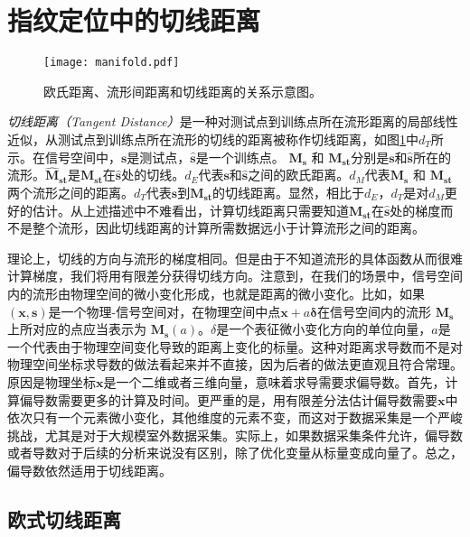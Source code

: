\section{指纹定位中的切线距离}

\begin{figure}[tb]
	\centering
	\texttt{[image: manifold.pdf]}
	\caption{欧氏距离、流形间距离和切线距离的关系示意图。}
	\label{fig:manifold}
\end{figure}

\textit{切线距离（Tangent Distance）}是一种对测试点到训练点所在流形距离的局部线性近似，从测试点到训练点所在流形的切线的距离被称作切线距离，如图\ref{fig:manifold}中$d_T$所示。在信号空间中，$\mathbf{s}$是测试点，$\widehat{\mathbf{s}}$是一个训练点。 $\boldsymbol{M_s}$ 和 $\boldsymbol{M_{st}}$分别是$\mathbf{s}$和$\widehat{\mathbf{s}}$所在的流形。$\boldsymbol{\widehat{M}_{st}}$是$\boldsymbol{M_{st}}$在$\widehat{\mathbf{s}}$处的切线。$d_E$代表$\mathbf{s}$和$\widehat{\mathbf{s}}$之间的欧氏距离。$d_M$代表$\boldsymbol{M_s}$ 和 $\boldsymbol{M_{st}}$两个流形之间的距离。$d_T$代表$\mathbf{s}$到$\boldsymbol{M_{st}}$的切线距离。显然，相比于$d_E$，$d_T$是对$d_M$更好的估计。从上述描述中不难看出，计算切线距离只需要知道$\boldsymbol{M_{st}}$在$\widehat{\mathbf{s}}$处的梯度而不是整个流形，因此切线距离的计算所需数据远小于计算流形之间的距离。

理论上，切线的方向与流形的梯度相同。但是由于不知道流形的具体函数从而很难计算梯度，我们将用有限差分获得切线方向。注意到，在我们的场景中，信号空间内的流形由物理空间的微小变化形成，也就是距离的微小变化。比如，如果$(\mathbf{x}, \mathbf{s})$是一个物理-信号空间对，在物理空间中点$\mathbf{x} + a{\bm{\delta}}$在信号空间内的流形 $\boldsymbol{M_s}$上所对应的点应当表示为 $\boldsymbol{M_s}(a)$。$\delta$是一个表征微小变化方向的单位向量，$a$是一个代表由于物理空间变化导致的距离上变化的标量。这种对距离求导数而不是对物理空间坐标求导数的做法看起来并不直接，因为后者的做法更直观且符合常理。原因是物理坐标$\mathbf{x}$是一个二维或者三维向量，意味着求导需要求偏导数。首先，计算偏导数需要更多的计算及时间。更严重的是，用有限差分法估计偏导数需要$\mathbf{x}$中依次只有一个元素微小变化，其他维度的元素不变，而这对于数据采集是一个严峻挑战，尤其是对于大规模室外数据采集。实际上，如果数据采集条件允许，偏导数或者导数对于后续的分析来说没有区别，除了优化变量从标量变成向量了。总之，偏导数依然适用于切线距离。

\subsection{欧式切线距离}

